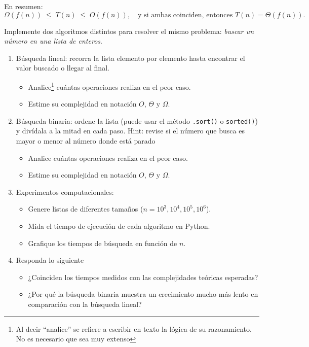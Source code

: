 \documentclass[12pt]{article}
\begin{document}
\begin{enumerate}[label=\textbf{\arabic*.}]
En resumen:
\[
\Omega(f(n)) \;\leq\; T(n) \;\leq\; O(f(n)), \quad 
\text{y si ambas coinciden, entonces } T(n)=\Theta(f(n)).
\]


Implemente dos algoritmos distintos para resolver el mismo problema: \emph{buscar un número en una lista de enteros}.

\begin{enumerate}[label=\alph*)]
    \item Búsqueda lineal: recorra la lista elemento por elemento hasta encontrar el valor buscado o llegar al final. 
    \begin{itemize}
        \item[1.] Analice\footnote{Al decir ``analice'' se refiere a escribir en texto la lógica de su razonamiento. No es necesario que sea muy extenso} cuántas operaciones realiza en el peor caso.
        \item[2.] Estime su complejidad en notación $O$, $\Theta$ y $\Omega$.
    \end{itemize}

    \item Búsqueda binaria: ordene la lista (puede usar el método \texttt{.sort()} o \texttt{sorted()}) y divídala a la mitad en cada paso. Hint: revise si el número que busca es mayor o menor al número donde está parado 
    \begin{itemize}
        \item[1.] Analice cuántas operaciones realiza en el peor caso.
        \item[2.] Estime su complejidad en notación $O$, $\Theta$ y $\Omega$.
    \end{itemize}

    \item Experimentos computacionales:
    \begin{itemize}
        \item[1.] Genere listas de diferentes tamaños ($n = 10^3, 10^4, 10^5, 10^6$).
        \item[2.] Mida el tiempo de ejecución de cada algoritmo en Python.
        \item[3.] Grafique los tiempos de búsqueda en función de $n$.
    \end{itemize}

    \item Responda lo siguiente
    \begin{itemize}
        \item[1.] ¿Coinciden los tiempos medidos con las complejidades teóricas esperadas?
        \item[2.] ¿Por qué la búsqueda binaria muestra un crecimiento mucho más lento en comparación con la búsqueda lineal?
    \end{itemize}
\end{enumerate}

\end{enumerate}
\end{document}
